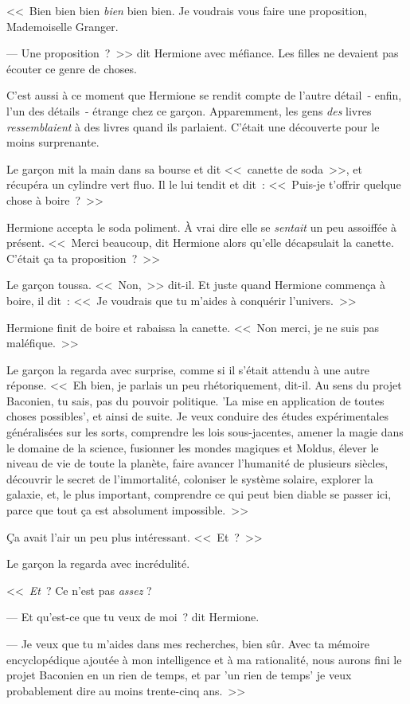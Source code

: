 <<~Bien bien bien \emph{bien} bien bien. Je voudrais vous faire une proposition, Mademoiselle Granger.

--- Une proposition~?~>> dit Hermione avec méfiance. Les filles ne devaient pas écouter ce genre de choses.

C'est aussi à ce moment que Hermione se rendit compte de l'autre détail~- enfin, l'un des détails~- étrange chez ce garçon. Apparemment, les gens \emph{des} livres \emph{ressemblaient} à des livres quand ils parlaient. C'était une découverte pour le moins surprenante.

Le garçon mit la main dans sa bourse et dit <<~canette de soda~>>, et récupéra un cylindre vert fluo. Il le lui tendit et dit~: <<~Puis-je t'offrir quelque chose à boire~?~>>

Hermione accepta le soda poliment. À vrai dire elle se \emph{sentait} un peu assoiffée à présent. <<~Merci beaucoup, dit Hermione alors qu'elle décapsulait la canette. C'était ça ta proposition~?~>>

Le garçon toussa. <<~Non,~>> dit-il. Et juste quand Hermione commença à boire, il dit~: <<~Je voudrais que tu m'aides à conquérir l'univers.~>>

Hermione finit de boire et rabaissa la canette. <<~Non merci, je ne suis pas maléfique.~>>

Le garçon la regarda avec surprise, comme si il s'était attendu à une autre réponse. <<~Eh bien, je parlais un peu rhétoriquement, dit-il. Au sens du projet Baconien, tu sais, pas du pouvoir politique. 'La mise en application de toutes choses possibles', et ainsi de suite. Je veux conduire des études expérimentales généralisées sur les sorts, comprendre les lois sous-jacentes, amener la magie dans le domaine de la science, fusionner les mondes magiques et Moldus, élever le niveau de vie de toute la planète, faire avancer l'humanité de plusieurs siècles, découvrir le secret de l'immortalité, coloniser le système solaire, explorer la galaxie, et, le plus important, comprendre ce qui peut bien diable se passer ici, parce que tout ça est absolument impossible.~>>

Ça avait l'air un peu plus intéressant. <<~Et~?~>>

Le garçon la regarda avec incrédulité.

<<~\emph{Et}~? Ce n'est pas \emph{assez} ?

--- Et qu'est-ce que tu veux de moi~? dit Hermione.

--- Je veux que tu m'aides dans mes recherches, bien sûr. Avec ta mémoire encyclopédique ajoutée à mon intelligence et à ma rationalité, nous aurons fini le projet Baconien en un rien de temps, et par 'un rien de temps' je veux probablement dire au moins trente-cinq ans.~>>

